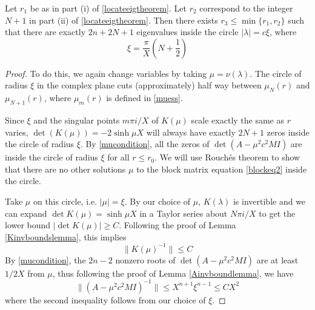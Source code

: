 \documentclass[thesis.tex]{subfiles}
\begin{document}
\begin{lemma}\label{eigcount}
Let $r_1$ be as in part (i) of \cref{locateeigtheorem}. Let $r_2$ correspond to the integer $N+1$ in part (ii) of \cref{locateeigtheorem}. Then there exists $r_3 \leq \min\{r_1, r_2\}$ such that there are exactly $2n + 2 N + 1$ eigenvalues inside the circle $|\lambda| = c \xi$, where
\[
\xi = \frac{\pi}{X}\left( N + \frac{1}{2} \right)
\]

\begin{proof}
To do this, we again change variables by taking $\mu = \nu(\lambda)$. The circle of radius $\xi$ in the complex plane cuts (approximately) half way between $\mu_N(r)$ and $\mu_{N+1}(r)$, where $\mu_m(r)$ is defined in \cref{muess}. 

Since $\xi$ and the singular points $m \pi i/X$ of $K(\mu)$ scale exactly the same as $r$ varies, $\det(K(\mu)) = -2 \sinh \mu X$ will always have exactly $2N + 1$ zeros inside the circle of radius $\xi$. By \cref{mucondition}, all the zeros of $\det(A - \mu^2 c^2 M I)$ are inside the circle of radius $\xi$ for all $r \leq r_0$. We will use Rouch\'es theorem to show that there are no other solutions $\mu$ to the block matrix equation \cref{blockeq2} inside the circle.

Take $\mu$ on this circle, i.e. $|\mu| = \xi$. By our choice of $\mu$, $K(\lambda)$ is invertible and we can expand $\det K(\mu) = \sinh \mu X$ in a Taylor series about $N \pi i/X$ to get the lower bound $|\det K(\mu)| \geq C$. Following the proof of Lemma \ref{Kinvboundslemma}, this implies
\begin{equation}\label{Kinvboundxi}
\|K(\mu)^{-1}\| \leq C
\end{equation}
By \cref{mucondition}, the $2n-2$ nonzero roots of $\det(A - \mu^2 c^2 M I)$ are at least $1/2X$ from $\mu$, thus following the proof of Lemma \ref{Ainvboundlemma}, we have
\begin{equation}\label{Ainvboundxi}
\|(A - \mu^2 c^2 M I)^{-1}\| \leq X^{n+1} \xi^{n-1} \leq C X^2
\end{equation}
where the second inequality follows from our choice of $\xi$. 


\end{proof}
\end{lemma}
\end{document}
